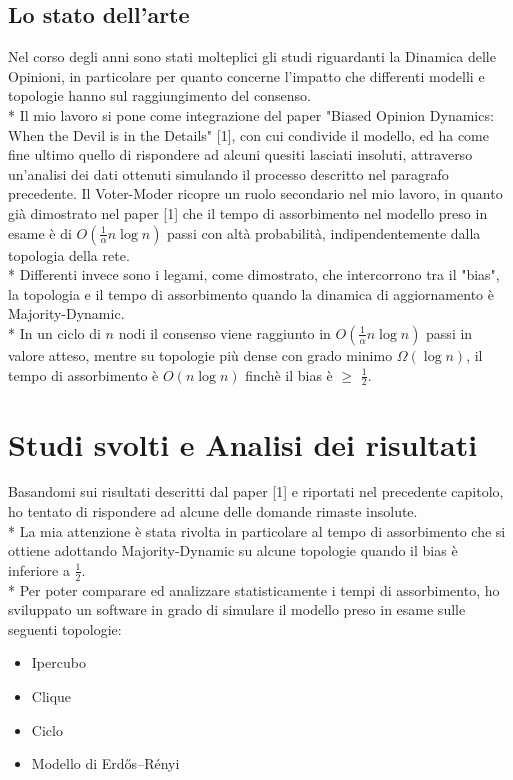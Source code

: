 \documentclass{article}
\begin{document}
\subsection{Lo stato dell'arte}
Nel corso degli anni sono stati molteplici gli studi riguardanti la Dinamica delle Opinioni, in particolare per quanto concerne l'impatto che differenti modelli e topologie hanno sul raggiungimento del consenso.\\*
Il mio lavoro si pone come integrazione del paper "Biased Opinion Dynamics: When the Devil is in the Details" [1], con cui condivide il modello, ed ha come fine ultimo quello di rispondere ad alcuni quesiti lasciati insoluti, attraverso un'analisi dei dati ottenuti simulando il processo descritto nel paragrafo precedente.
Il Voter-Moder ricopre un ruolo secondario nel mio lavoro, in quanto già dimostrato nel paper [1] che il tempo di assorbimento nel modello preso in esame è di $O(\frac{1}{\alpha}n\log{}n)$ passi con altà probabilità, indipendentemente dalla topologia della rete.\\*
Differenti invece sono i legami, come dimostrato, che intercorrono tra il "bias", la topologia e il tempo di assorbimento quando la dinamica di aggiornamento è Majority-Dynamic.\\*
In un ciclo di $n$ nodi il consenso viene raggiunto in $O(\frac{1}{\alpha}n\log{}n)$ passi in valore atteso, mentre su topologie più dense con grado minimo $\Omega(\log{}n)$, il tempo di assorbimento è $O(n\log{}n)$ finchè il bias è $\geq$ $\frac{1}{2}$.


\section{Studi svolti e Analisi dei risultati}
Basandomi sui risultati descritti dal paper [1] e riportati nel precedente capitolo, ho tentato di rispondere ad alcune delle domande rimaste insolute.\\*
La mia attenzione è stata rivolta in particolare al tempo di assorbimento che si ottiene adottando Majority-Dynamic su alcune topologie quando il bias è inferiore a $\frac{1}{2}$.\\*
Per poter comparare ed analizzare statisticamente i tempi di assorbimento, ho sviluppato un software in grado di simulare il modello preso in esame sulle seguenti topologie:
 \begin{itemize}
\item Ipercubo
\item Clique
\item Ciclo
\item Modello di Erdős–Rényi
\end{itemize}
\end{document}
